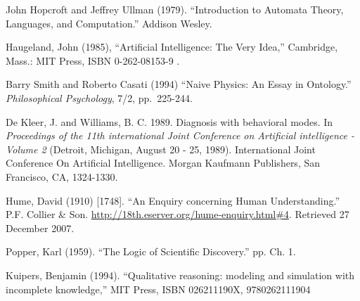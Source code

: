 \documentclass{article} %
\begin{document}
\begin{thebibliography}{99}
	John Hopcroft and Jeffrey Ullman (1979). 
	``Introduction to Automata Theory, Languages, and Computation.'' Addison Wesley.


	Haugeland, John (1985), 
	``Artificial Intelligence: The Very Idea,''
	Cambridge, Mass.: MIT Press, ISBN 0-262-08153-9 .

	Barry Smith and Roberto Casati (1994)
	``Naive Physics: An Essay in Ontology.''
	{\em Philosophical Psychology}, 7/2, pp.\ 225-244.

	De Kleer, J. and Williams, B. C. 1989. Diagnosis with behavioral modes.
	In \emph{Proceedings of the 11th international Joint Conference on Artificial
	intelligence - Volume 2} (Detroit, Michigan, August 20 - 25, 1989).
	International Joint Conference On Artificial Intelligence. Morgan
	Kaufmann Publishers, San Francisco, CA, 1324-1330. 

	Hume, David (1910) [1748]. 
	``An Enquiry concerning Human Understanding.''
	P.F. Collier \& Son. 
	\url{http://18th.eserver.org/hume-enquiry.html#4}. 
	Retrieved 27 December 2007.

	Popper, Karl (1959). 
	``The Logic of Scientific Discovery.'' pp. Ch. 1. 

	Kuipers, Benjamin (1994). ``Qualitative reasoning: modeling and simulation with incomplete knowledge,''
	MIT Press, ISBN	026211190X, 9780262111904

\end{thebibliography}
\end{document}

